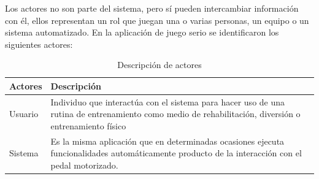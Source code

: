 Los actores no son parte del sistema, pero sí pueden intercambiar información con él, ellos representan un rol que juegan una o varias personas, un equipo o un sistema automatizado. En la aplicación de juego serio se identificaron los siguientes actores:

\begin{table}[ht]
    \centering
    \begin{tabularx}{\textwidth}{|l|X|}
        \hline
        \textbf{Actores} & \textbf{Descripción} \\\hline
        Usuario & Individuo que interactúa con el sistema para hacer uso de una rutina de entrenamiento
        como medio de rehabilitación, diversión o entrenamiento físico \\\hline
        Sistema & Es la misma aplicación que en determinadas ocasiones ejecuta funcionalidades automáticamente producto de la interacción con el pedal motorizado. \\\hline
    \end{tabularx}
    \label{tab: actores}
    \caption{Descripción de actores}
\end{table}

